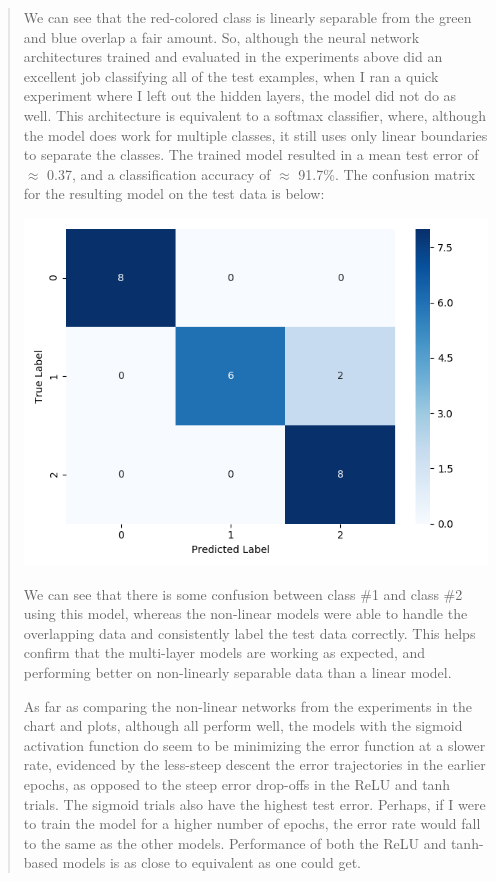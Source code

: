 \documentclass{article}
\begin{document}
\begin{quote}
We can see that the red-colored class is linearly separable from the green and blue overlap a fair amount. So, although the neural network architectures trained and evaluated in the experiments above did an excellent job classifying all of the test examples, when I ran a quick experiment where I left out the hidden layers, the model did not do as well. This architecture is equivalent to a softmax classifier, where, although the model does work for multiple classes, it still uses only linear boundaries to separate the classes. The trained model resulted in a mean test error of $\approx$ 0.37, and a classification accuracy of $\approx$ 91.7\%. The confusion matrix for the resulting model on the test data is below:
	 		\begin{center}
	 	\includegraphics[scale=0.3]{figs/iris_conf.png}
	 \end{center}
 
 We can see that there is some confusion between class \#1 and class \#2 using this model, whereas the non-linear models were able to handle the overlapping data and consistently label the test data correctly. This helps confirm that the multi-layer models are working as expected, and performing better on non-linearly separable data than a linear model. 
 
 As far as comparing the non-linear networks from the experiments in the chart and plots, although all perform well, the models with the sigmoid activation function do seem to be minimizing the error function at a slower rate, evidenced by the less-steep descent the error trajectories in the earlier epochs, as opposed to the steep error drop-offs in the ReLU and tanh trials. The sigmoid trials also have the highest test error. Perhaps, if I were to train the model for a higher number of epochs, the error rate would fall to the same as the other models. Performance of both the ReLU and tanh-based models is as close to equivalent as one could get.
 

\end{quote}
\end{document}
